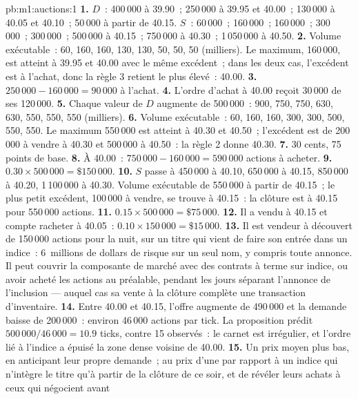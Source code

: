 \begin{solution}{pb:m1:auctions:1}
\textbf{1.} $D$~: 400\,000 à 39.90~; 250\,000 à 39.95 et 40.00~; 130\,000 à
40.05 et 40.10~; 50\,000 à partir de 40.15. $S$~: 60\,000~; 160\,000~; 160\,000~;
300\,000~; 300\,000~; 500\,000 à 40.15~; 750\,000 à 40.30~; 1\,050\,000 à
40.50.
\textbf{2.} Volume exécutable~: 60, 160, 160, 130, 130, 50, 50, 50 (milliers). Le
maximum, 160\,000, est atteint à 39.95 et 40.00 avec le même excédent~; dans les deux cas,
l'excédent est à l'achat, donc la règle 3 retient le plus élevé~: 40.00.
\textbf{3.} $250\,000 - 160\,000 = 90\,000$ à l'achat.
\textbf{4.} L'ordre d'achat à 40.00 reçoit 30\,000 de ses 120\,000.
\textbf{5.} Chaque valeur de $D$ augmente de 500\,000~: 900, 750, 750, 630, 630,
550, 550, 550 (milliers).
\textbf{6.} Volume exécutable~: 60, 160, 160, 300, 300, 500, 550, 550. Le maximum
550\,000 est atteint à 40.30 et 40.50~; l'excédent est de 200\,000 à vendre à 40.30
et 500\,000 à 40.50~: la règle 2 donne 40.30.
\textbf{7.} 30 cents, 75 points de base.
\textbf{8.} À 40.00~: $750\,000 - 160\,000 = 590\,000$ actions à acheter.
\textbf{9.} $0.30 \times 500\,000 = \$150\,000$.
\textbf{10.} $S$ passe à 450\,000 à 40.10, 650\,000 à 40.15, 850\,000 à
40.20, 1\,100\,000 à 40.30. Volume exécutable de 550\,000 à partir de 40.15~; le
plus petit excédent, 100\,000 à vendre, se trouve à 40.15~: la clôture est à 40.15 pour
550\,000 actions.
\textbf{11.} $0.15 \times 500\,000 = \$75\,000$.
\textbf{12.} Il a vendu à 40.15 et compte racheter à 40.05~: $0.10 \times
150\,000 = \$15\,000$.
\textbf{13.} Il est vendeur à découvert de 150\,000 actions pour la nuit, sur un titre qui vient
de faire son entrée dans un indice~: 6~millions de dollars de risque sur un seul nom, y compris toute annonce. Il peut
couvrir la composante de marché avec des contrats à terme sur indice, ou avoir acheté les actions
au préalable, pendant les jours séparant l'annonce de l'inclusion --- auquel
cas sa vente à la clôture complète une transaction d'inventaire.
\textbf{14.} Entre 40.00 et 40.15, l'offre augmente de 490\,000 et la demande
baisse de 200\,000~: environ 46\,000 actions par tick. La proposition prédit
$500\,000/46\,000 = 10.9$ ticks, contre 15 observés~: le carnet est irrégulier,
et l'ordre lié à l'indice a épuisé la zone dense voisine de 40.00.
\textbf{15.} Un prix moyen plus bas, en anticipant leur propre demande~; au
prix d'une  par rapport à un indice qui n'intègre le titre qu'à partir de
la clôture de ce soir, et de révéler leurs achats à ceux qui négocient avant

\end{solution}
